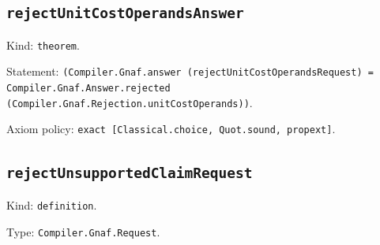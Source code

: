 \documentclass[11pt]{article}
\begin{document}
\subsection*{\texttt{rejectUnitCostOperandsAnswer}}
\noindent Kind: \texttt{theorem}.\par
\noindent Statement: \texttt{(Compiler.Gnaf.answer (rejectUnitCostOperandsRequest) = Compiler.Gnaf.Answer.rejected (Compiler.Gnaf.Rejection.unitCostOperands))}.\par
\noindent Axiom policy: \texttt{exact [Classical.choice, Quot.sound, propext]}.\par
\subsection*{\texttt{rejectUnsupportedClaimRequest}}
\noindent Kind: \texttt{definition}.\par
\noindent Type: \texttt{Compiler.Gnaf.Request}.\par
\end{document}
